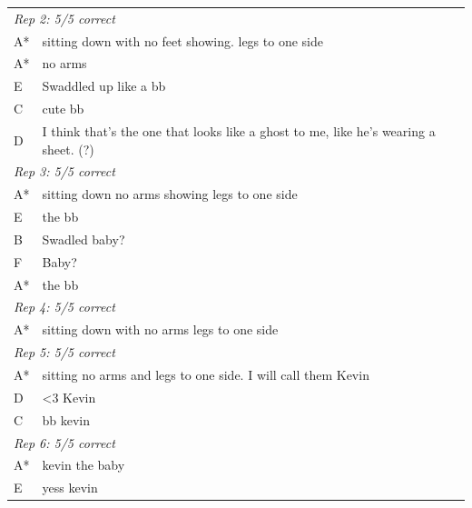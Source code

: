 \documentclass[class=pnas-new, varwidth=4in]{standalone}
\begin{document}
		\begin{tabular}{lp{2.8in}}
			\multicolumn{2}{l}{\textit{Rep 2: 5/5 correct}}\\
			A*  &   sitting down with no feet showing. legs to one side \\
			A*  &  no arms   \\                                     
			E &      Swaddled up like a bb \\                         
			C  &    cute bb    \\                                    
			D  &    I think that's the one that looks like a ghost to me, like he's wearing a sheet. (?)\\
			\multicolumn{2}{l}{\textit{Rep 3: 5/5 correct}}\\
			A*  &    sitting down no arms showing legs to one side  \\
			E  &   the bb   \\                                      
			B  &  Swadled baby?  \\                                
			F &    Baby?   \\   
			A* &    the bb     \\ 
			\multicolumn{2}{l}{\textit{Rep 4: 5/5 correct}}\\
			A*    & sitting down with no arms legs to one side \\
			\multicolumn{2}{l}{\textit{Rep 5: 5/5 correct}}\\
			A* & sitting no arms and legs to one side. I will call them Kevin \\
			D & <3 Kevin\\
			C & bb kevin \\
			\multicolumn{2}{l}{\textit{Rep 6: 5/5 correct}}\\
			A* & kevin the baby\\
			E & yess kevin\\
			\hline
			
			
			\hline
			

\end{tabular}
\end{document}
